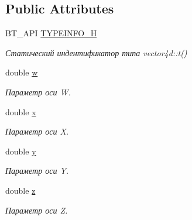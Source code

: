 \subsection*{Public Attributes}
\begin{DoxyCompactItemize}
\item 
\hypertarget{classbt_1_1vector4d_a93ee1c7c8c55ebdea938d9c89e39fe52}{B\-T\-\_\-\-A\-P\-I \hyperlink{classbt_1_1vector4d_a93ee1c7c8c55ebdea938d9c89e39fe52}{T\-Y\-P\-E\-I\-N\-F\-O\-\_\-\-H}}\label{classbt_1_1vector4d_a93ee1c7c8c55ebdea938d9c89e39fe52}

\begin{DoxyCompactList}\small\item\em Статический индентификатор типа vector4d\-::t() \end{DoxyCompactList}\item 
\hypertarget{classbt_1_1vector4d_a2ba72177061363815ae50f95f9263eaa}{double \hyperlink{classbt_1_1vector4d_a2ba72177061363815ae50f95f9263eaa}{w}}\label{classbt_1_1vector4d_a2ba72177061363815ae50f95f9263eaa}

\begin{DoxyCompactList}\small\item\em Параметр оси W. \end{DoxyCompactList}\item 
\hypertarget{classbt_1_1vector4d_a0f24ffb97deb0fcc254679cb4638439a}{double \hyperlink{classbt_1_1vector4d_a0f24ffb97deb0fcc254679cb4638439a}{x}}\label{classbt_1_1vector4d_a0f24ffb97deb0fcc254679cb4638439a}

\begin{DoxyCompactList}\small\item\em Параметр оси X. \end{DoxyCompactList}\item 
\hypertarget{classbt_1_1vector4d_a5d804db5eae1ab04197cdb937e776643}{double \hyperlink{classbt_1_1vector4d_a5d804db5eae1ab04197cdb937e776643}{y}}\label{classbt_1_1vector4d_a5d804db5eae1ab04197cdb937e776643}

\begin{DoxyCompactList}\small\item\em Параметр оси Y. \end{DoxyCompactList}\item 
\hypertarget{classbt_1_1vector4d_ae8584aeb8ad245869483de4fca05f95c}{double \hyperlink{classbt_1_1vector4d_ae8584aeb8ad245869483de4fca05f95c}{z}}\label{classbt_1_1vector4d_ae8584aeb8ad245869483de4fca05f95c}

\begin{DoxyCompactList}\small\item\em Параметр оси Z. \end{DoxyCompactList}\end{DoxyCompactItemize}
